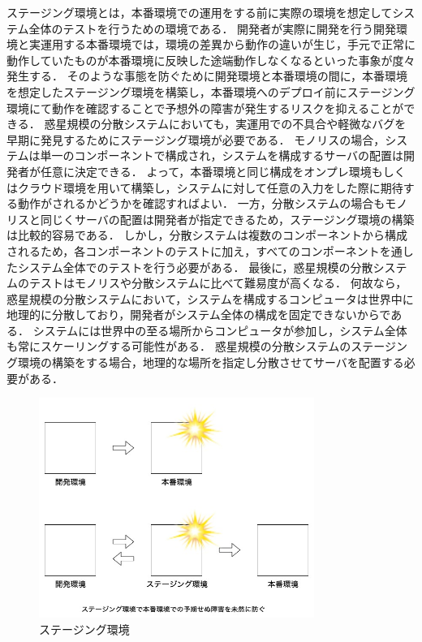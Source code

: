 ステージング環境とは，本番環境での運用をする前に実際の環境を想定してシステム全体のテストを行うための環境である．
開発者が実際に開発を行う開発環境と実運用する本番環境では，環境の差異から動作の違いが生じ，手元で正常に動作していたものが本番環境に反映した途端動作しなくなるといった事象が度々発生する．
そのような事態を防ぐために開発環境と本番環境の間に，本番環境を想定したステージング環境を構築し，本番環境へのデプロイ前にステージング環境にて動作を確認することで予想外の障害が発生するリスクを抑えることができる．
惑星規模の分散システムにおいても，実運用での不具合や軽微なバグを早期に発見するためにステージング環境が必要である．
モノリスの場合，システムは単一のコンポーネントで構成され，システムを構成するサーバの配置は開発者が任意に決定できる．
よって，本番環境と同じ構成をオンプレ環境もしくはクラウド環境を用いて構築し，システムに対して任意の入力をした際に期待する動作がされるかどうかを確認すればよい．
一方，分散システムの場合もモノリスと同じくサーバの配置は開発者が指定できるため，ステージング環境の構築は比較的容易である．
しかし，分散システムは複数のコンポーネントから構成されるため，各コンポーネントのテストに加え，すべてのコンポーネントを通したシステム全体でのテストを行う必要がある．
最後に，惑星規模の分散システムのテストはモノリスや分散システムに比べて難易度が高くなる．
何故なら，惑星規模の分散システムにおいて，システムを構成するコンピュータは世界中に地理的に分散しており，開発者がシステム全体の構成を固定できないからである．
システムには世界中の至る場所からコンピュータが参加し，システム全体も常にスケーリングする可能性がある．
惑星規模の分散システムのステージング環境の構築をする場合，地理的な場所を指定し分散させてサーバを配置する必要がある．


\begin{figure}[htbp]
  \begin{center}
    \includegraphics[width=0.8\textwidth]{./figures/staging.jpg}
    \caption{ステージング環境}
  \end{center}
\end{figure}


